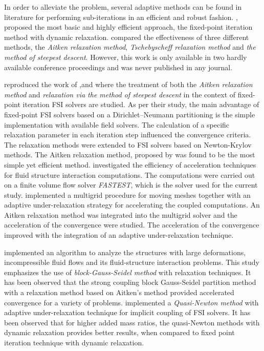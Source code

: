 In order to alleviate the problem, several adaptive methods can be found in literature for performing sub-iterations in an efficient and robust fashion. \citet{mok2001partitioned}, \citet{wall1999partitioned} proposed the most basic and highly efficient approach, the fixed-point iteration method with
dynamic relaxation. \citet{wall1999partitioned} compared the effectiveness of three different methods, the \textit{Aitken relaxation method}, \textit{Tschebyscheff relaxation method} and \textit{the method of steepest descent}. However, this work is only available in two hardly available conference proceedings and was never published in any journal.

\citet{kuttler2008fixed} reproduced the work of \citet{mok2001partitioned},and \citet{wall1999partitioned} where the treatment of both the \textit{Aitken relaxation method} and \textit{relaxation via the method of steepest descent} in the context of fixed-point iteration FSI solvers are studied. As per their study, the main advantage of fixed-point FSI solvers based on a Dirichlet–Neumann partitioning is the simple implementation with available field solvers. The calculation of a specific relaxation parameter in each iteration step influenced the convergence criteria. The relaxation methods were extended to FSI solvers based on Newton-Krylov methods. The Aitken relaxation method, proposed by \citet{irons1969version} was found to be the most simple yet efficient method. \citet{yigit2007efficiency} investigated the efficiency of acceleration techniques for fluid structure interaction computations. The computations were carried out on a finite volume flow solver \textit{FASTEST}, which is the solver used for the current study. \citet{yigit2007efficiency} implemented a multigrid procedure for moving meshes together with an adaptive under-relaxation strategy for accelerating the coupled computations. An Aitken relaxation method was integrated into the multigrid solver and the acceleration of the convergence were studied. The acceleration of the convergence improved with the integration of an adaptive under-relaxation technique. 

\citet{valdes2016nonlinear} implemented an algorithm to analyze the structures with large deformations, incompressible fluid flows and its fluid-structure interaction problems. This study emphasizes the use of \textit{block-Gauss-Seidel method} with relaxation techniques.       It has been observed that the strong coupling block Gauss-Seidel partition method with a relaxation method based on Aitken's method provided accelerated convergence for a variety of problems. \citet{bogaers2014quasi} implemented a \textit{Quasi-Newton method} with adaptive under-relaxation technique for implicit coupling of FSI solvers. It has been observed that for higher added mass ratios, the quasi-Newton methods with dynamic relaxation provides better results, when compared to fixed point iteration technique with dynamic relaxation.    

